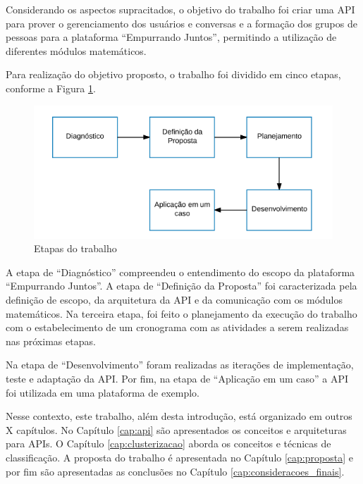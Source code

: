 

Considerando os aspectos supracitados, o objetivo do trabalho foi criar uma API para prover o gerenciamento dos usuários e conversas e a formação
dos grupos de pessoas para a plataforma ``Empurrando Juntos'', permitindo a utilização de diferentes
módulos matemáticos. 

Para realização do objetivo proposto, o trabalho foi dividido em cinco etapas, conforme a Figura \ref{fig:etapas_trabalho}. 

\begin{figure}[h!]
\centering
\includegraphics[scale=0.6]{figuras/etapas.png}
\caption{Etapas do trabalho}
\label{fig:etapas_trabalho}
\end{figure}

A etapa de ``Diagnóstico'' compreendeu o entendimento do escopo da plataforma ``Empurrando Juntos''. A etapa de ``Definição da Proposta'' foi caracterizada pela definição de escopo, 
da arquitetura da API e da comunicação com os módulos matemáticos. Na terceira etapa, foi feito o planejamento da execução do trabalho com o estabelecimento
de um cronograma com as atividades a serem realizadas nas próximas etapas. 

Na etapa de ``Desenvolvimento'' foram realizadas as iterações de implementação, teste e adaptação da API. Por fim, na etapa de ``Aplicação em um caso'' a API foi utilizada em uma 
plataforma de exemplo.

Nesse contexto, este trabalho, além desta introdução, está organizado em outros X capítulos. 
No Capítulo \ref{cap:api} são apresentados os conceitos e arquiteturas para APIs. O Capítulo \ref{cap:clusterizacao} aborda os conceitos e técnicas de 
classificação. A proposta do trabalho é apresentada no Capítulo \ref{cap:proposta} e por fim são apresentadas as conclusões no Capítulo 
\ref{cap:consideracoes_finais}.


